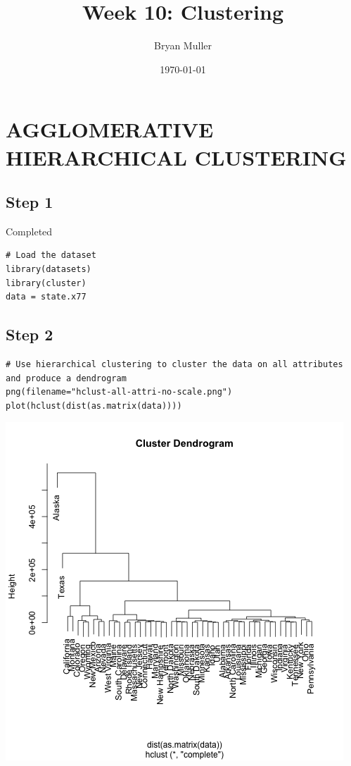 \documentclass[11pt]{article}
\author{Bryan Muller}
\date{\today}
\title{Week 10: Clustering}
\begin{document}
\maketitle

\section*{AGGLOMERATIVE HIERARCHICAL CLUSTERING}
\label{sec:org5d29fa5}
\subsection*{Step 1}
\label{sec:orgd6d9830}
Completed
\begin{verbatim}
# Load the dataset
library(datasets)
library(cluster)
data = state.x77
\end{verbatim}
\subsection*{Step 2}
\label{sec:org34f5397}
\begin{verbatim}
# Use hierarchical clustering to cluster the data on all attributes and produce a dendrogram
png(filename="hclust-all-attri-no-scale.png")
plot(hclust(dist(as.matrix(data))))
\end{verbatim}

\begin{center}
\includegraphics[width=.9\linewidth]{hclust-all-attri-no-scale.png}
\end{center}
\end{document}
